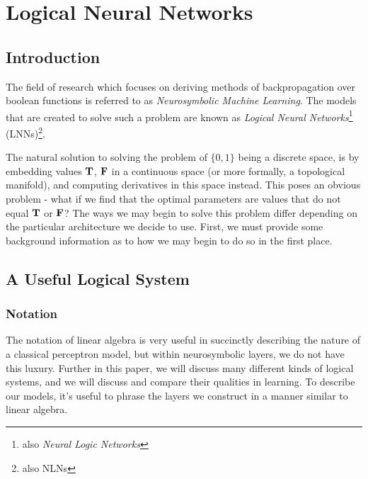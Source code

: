 
\chapter{Logical Neural Networks}

\section{Introduction}

The field of research which focuses on deriving methods of backpropagation over boolean functions is referred to as \textit{Neurosymbolic Machine Learning}. The models that are created to solve such a problem are known as \textit{Logical Neural Networks}\footnote{also \textit{Neural Logic Networks}} (LNNs)\footnote{also NLNs}. 

The natural solution to solving the problem of $\{0,1\}$ being a discrete space, is by embedding values $\textbf{T}$, $\textbf{F}$ in a continuous space (or more formally, a topological manifold), and computing derivatives in this space instead. This poses an obvious problem - what if we find that the optimal parameters are values that do not equal $\textbf{T}$ or $\textbf{F}$? The ways we may begin to solve this problem differ depending on the particular architecture we decide to use. First, we must provide some background information as to how we may begin to do so in the first place.



\section{A Useful Logical System}

\subsection{Notation}

The notation of linear algebra is very useful in succinctly describing the nature of a classical perceptron model, but within neurosymbolic layers, we do not have this luxury. Further in this paper, we will discuss many different kinds of logical systems, and we will discuss and compare their qualities in learning. To describe our models, it's useful to phrase the layers we construct in a manner similar to linear algebra.

